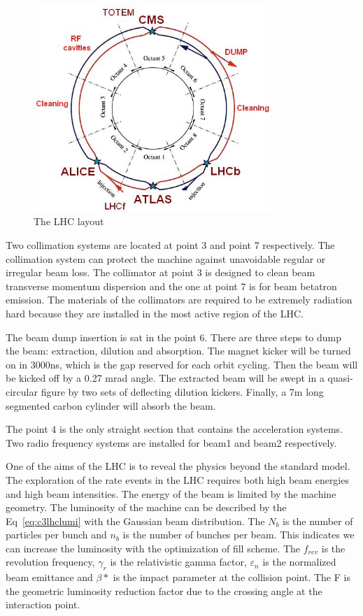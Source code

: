 \begin{figure}[htbp]
 \begin{center}
  \includegraphics[width=0.8\textwidth]{figures/c3/c3_lhc_latticelayout.jpg}
 \end{center}
 \caption{The LHC layout}
 \label{fig:c3lhclayout}
\end{figure}

Two collimation systems\cite{Assmann:691766} are located at point 3 and point 7 respectively. The collimation system can protect the machine against unavoidable regular or irregular beam loss. The collimator at point 3 is designed to clean beam transverse momentum dispersion and the one at point 7 is for beam betatron emission. The materials of the collimators are required to be extremely radiation hard because they are installed in the most active region of the LHC. 

The beam dump insertion is sat in the point 6. There are three steps to dump the beam: extraction, dilution and absorption. The magnet kicker will be turned on in 3000ns, which is the gap reserved for each orbit cycling. Then the beam will be kicked off by a 0.27 mrad angle. The extracted beam will be swept in a quasi-circular figure by two sets of deflecting dilution kickers. Finally, a 7m long segmented carbon cylinder will absorb the beam.

The point 4 is the only straight section that contains the acceleration systems. Two radio frequency systems are installed for beam1 and beam2 respectively. 

One of the aims of the LHC is to reveal the physics beyond the standard model. The exploration of the rate events in the LHC requires both high beam energies and high beam intensities. The energy of the beam is limited by the machine geometry. The luminosity of the machine can be described by the Eq~\ref{eq:c3lhclumi} with the Gaussian beam distribution. The $N_{b}$ is the number of particles per bunch and $n_{b}$ is the number of bunches per beam. This indicates we can increase the luminosity with the optimization of fill scheme. The $f_{rev}$ is the revolution frequency, $\gamma_{r}$ is the relativistic gamma factor, $\varepsilon_{n}$ is the normalized beam emittance and $\beta *$ is the impact parameter at the collision point. The F is the geometric luminosity reduction factor due to the crossing angle at the interaction point. 

